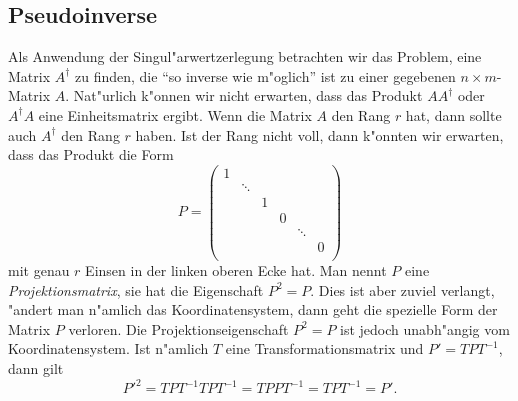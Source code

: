 \subsection{Pseudoinverse}
Als Anwendung der Singul"arwertzerlegung betrachten wir das Problem, eine Matrix
$A^\dagger$
zu finden, die ``so inverse wie m"oglich'' ist zu einer gegebenen
$n\times m$-Matrix $A$.
Nat"urlich k"onnen wir nicht erwarten, dass das Produkt $AA^\dagger$ 
oder $A^\dagger A$
eine Einheitsmatrix ergibt.
Wenn die Matrix $A$ den Rang $r$ hat, dann sollte auch $A^\dagger$ den Rang $r$
haben.
Ist der Rang nicht voll, dann k"onnten wir erwarten, dass das Produkt die Form
\[
P=
\begin{pmatrix}
1&      & & &      & \\
 &\ddots& & &      & \\
 &      &1& &      & \\
 &      & &0&      & \\
 &      & & &\ddots& \\
 &      & & &      &0\\
\end{pmatrix}
\]
mit genau $r$ Einsen in der linken oberen Ecke hat.
Man nennt $P$ eine {\em Projektionsmatrix}, sie hat die Eigenschaft $P^2=P$.
Dies ist aber zuviel verlangt, "andert man n"amlich das Koordinatensystem,
dann geht die spezielle Form der Matrix $P$ verloren.
Die Projektionseigenschaft $P^2=P$ ist jedoch unabh"angig vom Koordinatensystem.
Ist n"amlich $T$ eine Transformationsmatrix und $P'=TPT^{-1}$, dann gilt
\[
P'^2=TPT^{-1}TPT^{-1}=TPPT^{-1}=TPT^{-1}=P'.
\]

